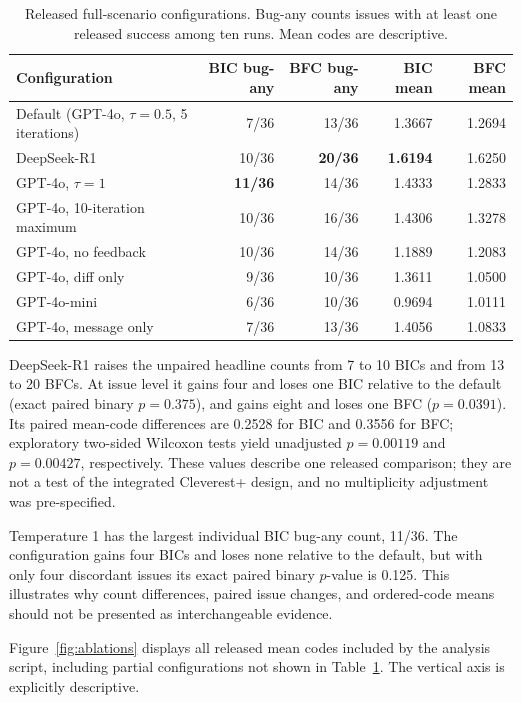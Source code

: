 \documentclass{article}
\begin{document}
\begin{table}[H]
\centering
\caption{Released full-scenario configurations.  Bug-any counts issues with at
least one released success among ten runs.  Mean codes are descriptive.}
\label{tab:ablation}
\small
\begin{tabular}{lrrrr}
\toprule
Configuration & BIC bug-any & BFC bug-any & BIC mean & BFC mean \\
\midrule
Default (GPT-4o, $\tau=0.5$, 5 iterations) & 7/36 & 13/36 & 1.3667 & 1.2694 \\
DeepSeek-R1 & 10/36 & \textbf{20/36} & \textbf{1.6194} & 1.6250 \\
GPT-4o, $\tau=1$ & \textbf{11/36} & 14/36 & 1.4333 & 1.2833 \\
GPT-4o, 10-iteration maximum & 10/36 & 16/36 & 1.4306 & 1.3278 \\
GPT-4o, no feedback & 10/36 & 14/36 & 1.1889 & 1.2083 \\
GPT-4o, diff only & 9/36 & 10/36 & 1.3611 & 1.0500 \\
GPT-4o-mini & 6/36 & 10/36 & 0.9694 & 1.0111 \\
GPT-4o, message only & 7/36 & 13/36 & 1.4056 & 1.0833 \\
\bottomrule
\end{tabular}
\end{table}

DeepSeek-R1 raises the unpaired headline counts from 7 to 10 BICs and from 13
to 20 BFCs.  At issue level it gains four and loses one BIC relative to the
default (exact paired binary $p=0.375$), and gains eight and loses one BFC
($p=0.0391$).  Its paired mean-code differences are 0.2528 for BIC and 0.3556
for BFC; exploratory two-sided Wilcoxon tests yield unadjusted $p=0.00119$ and
$p=0.00427$, respectively.  These values describe one released comparison;
they are not a test of the integrated Cleverest+ design, and no multiplicity
adjustment was pre-specified.

Temperature 1 has the largest individual BIC bug-any count, 11/36.  The
configuration gains four BICs and loses none relative to the default, but with
only four discordant issues its exact paired binary $p$-value is 0.125.  This
illustrates why count differences, paired issue changes, and ordered-code means
should not be presented as interchangeable evidence.

Figure~\ref{fig:ablations} displays all released mean codes included by the
analysis script, including partial configurations not shown in Table~\ref{tab:ablation}.  The vertical axis is explicitly descriptive.
\end{document}
